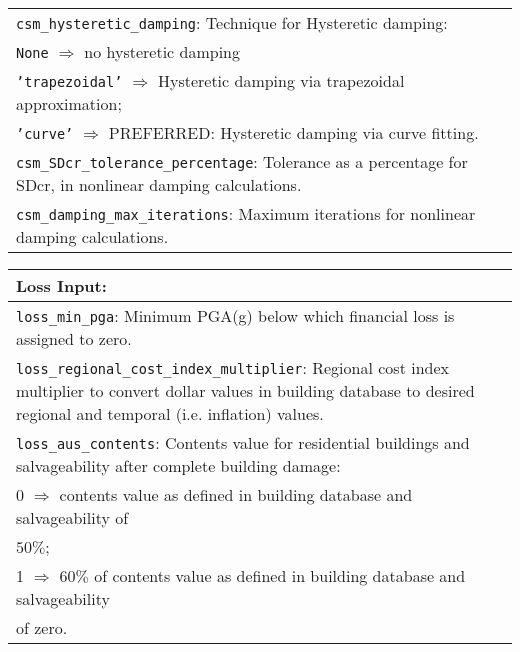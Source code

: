 \documentclass[a4paper, 12pt]{report}
\begin{document}
\begin{tabular}{|p{\textwidth}|}
\hline
\vspace{0.1em} \texttt{csm\_hysteretic\_damping}:
Technique for Hysteretic  damping: \\
 \hspace{0.5em} \texttt{None} $\Rightarrow$ no hysteretic  damping \\
 \hspace{0.5em} \texttt{'trapezoidal'} $\Rightarrow$ Hysteretic  damping via trapezoidal approximation; \\
 \hspace{0.5em} \texttt{'curve'} $\Rightarrow$ \small{PREFERRED}: Hysteretic  damping via curve fitting. \\
\hline
\vspace{0.1em} \texttt{csm\_SDcr\_tolerance\_percentage}:
Tolerance as a percentage for SDcr, in nonlinear damping calculations.   \\
\hline
\vspace{0.1em} \texttt{csm\_damping\_max\_iterations}:
 Maximum iterations for nonlinear damping calculations.\\
 \hline
 \end{tabular}


\vspace{2em}
\begin{tabular}{|p{\textwidth}|}
\hline
\vspace{0.3em} \noindent \Large \textbf{Loss Input:} \normalsize \\
\hline
\vspace{0.1em} \texttt{loss\_min\_pga}:
Minimum PGA(g) below which financial loss is assigned to zero. \\
 \hline
\vspace{0.1em} \texttt{loss\_regional\_cost\_index\_multiplier}:
Regional cost index multiplier to convert dollar values in building
database to desired regional and temporal (i.e. inflation) values.\\
\hline
\vspace{0.1em} \texttt{loss\_aus\_contents}:
Contents value for residential buildings and salvageability after complete building damage:   \\
\hspace{0.5em} 0 $\Rightarrow$ contents value as defined in building
  database and salvageability of \\
  \hspace{2.5em} $50\%$;\\
\hspace{0.5em} 1 $\Rightarrow$ $60\%$ of contents value as defined in
building database and salvageability \\
\hspace{2.5em} of zero.\\
  \hline
 \end{tabular}
\end{document}
